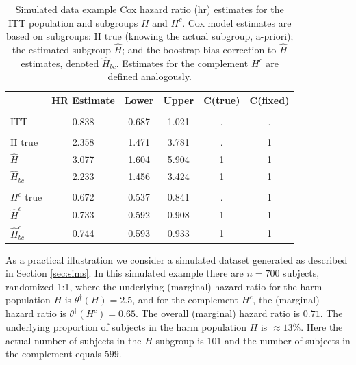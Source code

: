 \documentclass[smallextended]{svjour3}
\def\hplim{\theta^{\dagger}(H)}
\def\hcplim{\theta^{\dagger}(H^{c})}
\begin{document}
\begin{table}

\caption{\label{tab:simex1_tab}\label{tab:simex1} Simulated data example Cox hazard ratio (hr) estimates for the ITT population and subgroups $H$ and $H^{c}$.
Cox model estimates are based on subgroups: H true (knowing the actual subgroup, a-priori); the estimated subgroup $\hat{H}$; and 
the boostrap bias-correction to $\hat{H}$ estimates, denoted $\hat{H}_{bc}$.  Estimates for the complement $H^{c}$ are defined analogously.}
\centering
\fontsize{9}{11}\selectfont
\begin{tabular}[t]{lccccc}
\toprule
  & HR Estimate & Lower & Upper & C(true) & C(fixed)\\
\midrule
\addlinespace[0.3em]
\multicolumn{6}{l}{\textbf{ITT}}\\
\hspace{1em}ITT & 0.838 & 0.687 & 1.021 & . & .\\
\addlinespace[0.3em]
\multicolumn{6}{l}{\textbf{H subgroup estimates}}\\
\hspace{1em}H true & 2.358 & 1.471 & 3.781 & . & 1\\
\hspace{1em}$\hat{H}$ & 3.077 & 1.604 & 5.904 & 1 & 1\\
\hspace{1em}$\hat{H}_{bc}$ & 2.233 & 1.456 & 3.424 & 1 & 1\\
\addlinespace[0.3em]
\multicolumn{6}{l}{\textbf{H-complement subgroup estimates}}\\
\hspace{1em}$H^{c}$ true & 0.672 & 0.537 & 0.841 & . & 1\\
\hspace{1em}$\hat{H}^{c}$ & 0.733 & 0.592 & 0.908 & 1 & 1\\
\hspace{1em}$\hat{H}^{c}_{bc}$ & 0.744 & 0.593 & 0.933 & 1 & 1\\
\bottomrule
\end{tabular}
\end{table}





As a practical illustration we consider a simulated dataset generated as described in Section \ref{sec:sims}.   In this simulated example there are 
$n=700$ subjects, randomized 1:1, where the underlying (marginal) hazard ratio for the harm population $H$ is 
$\hplim =2.5$, and for the complement $H^{c}$, the (marginal) hazard ratio is $\hcplim =0.65$.  The overall (marginal) 
hazard ratio is $0.71$.  The underlying proportion of subjects in the harm population $H$ is $\approx 13\%$.  Here the actual number of subjects in the $H$ subgroup is 
$101$ and the number of subjects in the complement equals $599$.  
\end{document}
